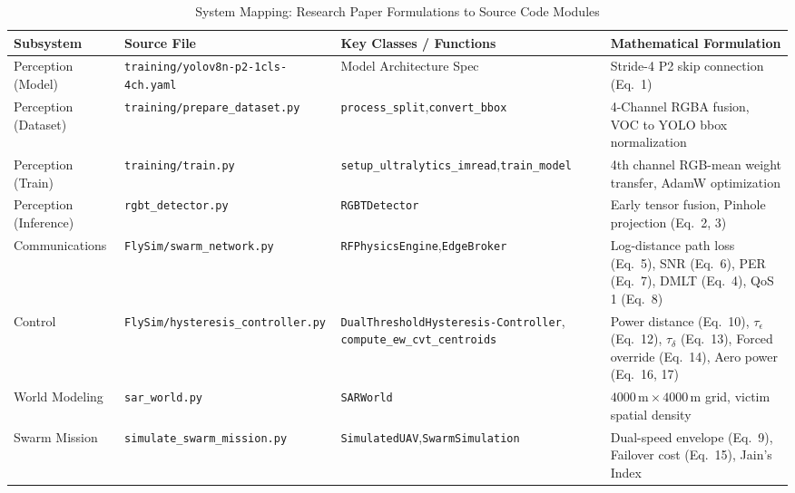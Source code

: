 \documentclass[10pt,a4paper]{article}
\begin{document}
\vspace{6pt}

\begin{table}[htbp]
\centering
\caption{System Mapping: Research Paper Formulations to Source Code Modules}
\label{tab:code_map}
\footnotesize
\renewcommand{\arraystretch}{1.2}
\begin{tabularx}{\textwidth}{l>{\raggedright\arraybackslash}p{4.8cm}>{\raggedright\arraybackslash}p{4.5cm}X}
\toprule
\textbf{Subsystem} & \textbf{Source File} & \textbf{Key Classes / Functions} & \textbf{Mathematical Formulation} \\
\midrule
Perception (Model) & \texttt{training/}\newline\texttt{yolov8n-p2-1cls-4ch.yaml} & Model Architecture Spec & Stride-4 P2 skip connection (Eq.~1) \\
Perception (Dataset) & \texttt{training/}\newline\texttt{prepare\_dataset.py} & \texttt{process\_split},\newline\texttt{convert\_bbox} & 4-Channel RGBA fusion, VOC to YOLO bbox normalization \\
Perception (Train) & \texttt{training/train.py} & \texttt{setup\_ultralytics\_imread},\newline\texttt{train\_model} & 4th channel RGB-mean weight transfer, AdamW optimization \\
Perception (Inference) & \texttt{rgbt\_detector.py} & \texttt{RGBTDetector} & Early tensor fusion, Pinhole projection (Eq.~2, 3) \\
Communications & \texttt{FlySim/swarm\_network.py} & \texttt{RFPhysicsEngine},\newline\texttt{EdgeBroker} & Log-distance path loss (Eq.~5), SNR (Eq.~6), PER (Eq.~7), DMLT (Eq.~4), QoS 1 (Eq.~8) \\
Control & \texttt{FlySim/}\newline\texttt{hysteresis\_controller.py} & \texttt{DualThresholdHysteresis-}\newline\texttt{Controller}, \texttt{compute\_ew\_}\newline\texttt{cvt\_centroids} & Power distance (Eq.~10), $\tau_\epsilon$ (Eq.~12), $\tau_\delta$ (Eq.~13), Forced override (Eq.~14), Aero power (Eq.~16, 17) \\
World Modeling & \texttt{sar\_world.py} & \texttt{SARWorld} & $4000\,\text{m} \times 4000\,\text{m}$ grid, victim spatial density \\
Swarm Mission & \texttt{simulate\_swarm\_mission.py} & \texttt{SimulatedUAV},\newline\texttt{SwarmSimulation} & Dual-speed envelope (Eq.~9), Failover cost (Eq.~15), Jain's Index \\
\bottomrule
\end{tabularx}
\end{table}
\end{document}
